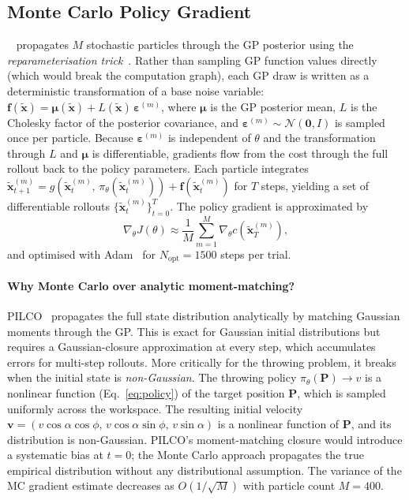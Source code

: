 \subsection{Monte Carlo Policy Gradient}
\label{sec:background:mcpg}

\mcpilco{}~\cite{mcpilco} propagates $M$ stochastic particles through the GP posterior
using the \emph{reparameterisation trick}~\cite{kingma2014auto}.
Rather than sampling GP function values directly (which would break the computation
graph), each GP draw is written as a deterministic transformation of a base noise
variable: $\mathbf{f}(\tilde{\mathbf{x}}) = \boldsymbol{\mu}(\tilde{\mathbf{x}}) +
L(\tilde{\mathbf{x}})\,\boldsymbol{\varepsilon}^{(m)}$, where $\boldsymbol{\mu}$ is
the GP posterior mean, $L$ is the Cholesky factor of the posterior covariance, and
$\boldsymbol{\varepsilon}^{(m)} \sim \mathcal{N}(\mathbf{0}, I)$ is sampled once per
particle.
Because $\boldsymbol{\varepsilon}^{(m)}$ is independent of $\theta$ and the
transformation through $L$ and $\boldsymbol{\mu}$ is differentiable, gradients flow
from the cost through the full rollout back to the policy parameters.
Each particle integrates $\tilde{\mathbf{x}}_{t+1}^{(m)} = g(\tilde{\mathbf{x}}_t^{(m)},\,
\pi_\theta(\tilde{\mathbf{x}}_t^{(m)})) + \mathbf{f}(\tilde{\mathbf{x}}_t^{(m)})$
for $T$ steps, yielding a set of differentiable rollouts
$\{\tilde{\mathbf{x}}_t^{(m)}\}_{t=0}^T$.
The policy gradient is approximated by
\begin{equation}
  \nabla_\theta J(\theta) \approx \frac{1}{M}\sum_{m=1}^{M} \nabla_\theta
    c\!\left(\tilde{\mathbf{x}}_T^{(m)}\right),
  \label{eq:mcpilco_gradient}
\end{equation}
and optimised with Adam~\cite{kingma2015adam} for $N_{\mathrm{opt}} = 1500$ steps per
trial.

\paragraph{Why Monte Carlo over analytic moment-matching?}
PILCO~\cite{pilco} propagates the full state distribution analytically by matching
Gaussian moments through the GP.
This is exact for Gaussian initial distributions but requires a Gaussian-closure
approximation at every step, which accumulates errors for multi-step rollouts.
More critically for the throwing problem, it breaks when the initial state is
\emph{non-Gaussian}.
The throwing policy $\pi_\theta(\mathbf{P}) \to v$ is a nonlinear function
(Eq.~\ref{eq:policy}) of the target position $\mathbf{P}$, which is sampled uniformly
across the workspace.
The resulting initial velocity $\mathbf{v} = (v\cos\alpha\cos\phi,\,
v\cos\alpha\sin\phi,\, v\sin\alpha)$ is a nonlinear function of $\mathbf{P}$, and
its distribution is non-Gaussian.
PILCO's moment-matching closure would introduce a systematic bias at $t=0$; the Monte
Carlo approach propagates the true empirical distribution without any distributional
assumption.
The variance of the MC gradient estimate decreases as $O(1/\sqrt{M})$ with particle
count $M = 400$.

